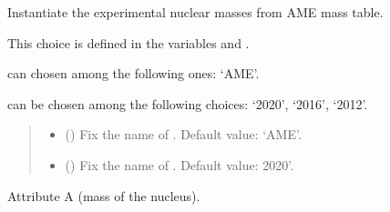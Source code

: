 \documentclass[letterpaper,10pt,english]{sphinxmanual}
\begin{document}
\begin{fulllineitems}
\label{\detokenize{source/api/setup_masses:nucleardatapy.setup_masses.SetupMasses}}
\pysigstartsignatures
{}
\pysigstopsignatures
\sphinxAtStartPar
Instantiate the experimental nuclear masses from AME mass table.

\sphinxAtStartPar
This choice is defined in the variables  and .

\sphinxAtStartPar
{} can chosen among the following ones: ‘AME’.

\sphinxAtStartPar
{} can be chosen among the following choices: ‘2020’, ‘2016’, ‘2012’.
\begin{quote}\begin{description}
\begin{itemize}
\item {} 
\sphinxAtStartPar
{} (\sphinxstyleliteralemphasis{\sphinxupquote{, }}) \textendash{} Fix the name of . Default value: ‘AME’.

\item {} 
\sphinxAtStartPar
{} (\sphinxstyleliteralemphasis{\sphinxupquote{, }}) \textendash{} Fix the name of . Default value: 2020’.

\end{itemize}

\end{description}\end{quote}

\sphinxAtStartPar
{}

\begin{fulllineitems}
\label{\detokenize{source/api/setup_masses:nucleardatapy.setup_masses.SetupMasses.A}}
\pysigstartsignatures
{}
\pysigstopsignatures
\sphinxAtStartPar
Attribute A (mass of the nucleus).


\end{fulllineitems}
\end{fulllineitems}
\end{document}
